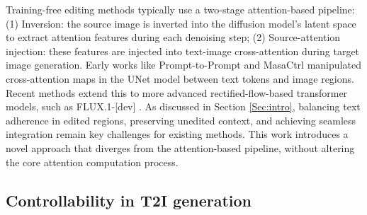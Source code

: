 \documentclass{article}
\begin{document}



Training-free editing methods typically use a two-stage attention-based pipeline: (1) Inversion: the source image is inverted into the diffusion model's latent space to extract attention features during each denoising step; (2) Source-attention injection: these features are injected into text-image cross-attention during target image generation. Early works like Prompt-to-Prompt \citep{hertz2022prompt} and MasaCtrl \citep{cao2023masactrl} manipulated cross-attention maps in the UNet model between text tokens and image regions. Recent methods \citep{rout2024semantic,wang2024taming,deng2024fireflow,tewel2025addit,zhu2025kv} extend this to more advanced rectified-flow-based transformer models, such as FLUX.1-[dev] \citep{blackforest2024FLUX}. As discussed in Section \ref{Sec:intro}, balancing text adherence in edited regions, preserving unedited context, and achieving seamless integration remain key challenges for existing methods. This work introduces a novel approach that diverges from the attention-based pipeline, without altering the core attention computation process.




\vspace{-2mm}

\subsection{Controllability in T2I generation}
\end{document}
